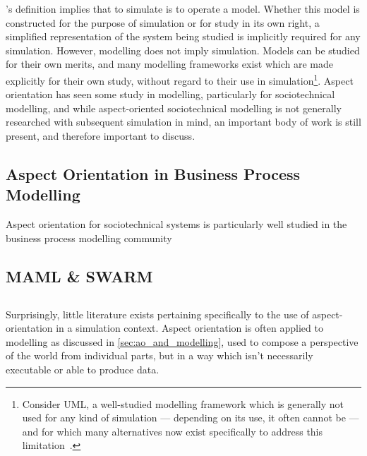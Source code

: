 \citeauthor{smintro}'s definition implies that to simulate is to operate a
model. Whether this model is constructed for the purpose of simulation or for
study in its own right, a simplified representation of the system being studied
is implicitly required for any simulation. However, modelling does not imply
simulation. Models can be studied for their own merits, and many modelling
frameworks exist which are made explicitly for their own study, without regard
to their use in simulation\footnote{Consider UML, a well-studied modelling
framework which is generally not used for any kind of simulation --- depending
on its use, it often cannot be --- and for which many alternatives now exist
specifically to address this
limitation~\cite{opm_original,ExecutableBPMNMitsyuk}.}. Aspect orientation has seen some study in modelling,
particularly for sociotechnical modelling, and while aspect-oriented
sociotechnical modelling is not generally researched with subsequent simulation
in mind, an important body of work is still present, and therefore important to
discuss.

\subsection{Aspect Orientation in Business Process Modelling}
Aspect orientation for sociotechnical systems is particularly well studied in
the business process modelling
community\cite{Machado_2011,Cappelli_AOBPM}~


\subsection{MAML \& SWARM}


\subsection{}




Surprisingly, little literature exists pertaining specifically to the use of
aspect-orientation in a simulation context. Aspect orientation is often applied
to modelling as discussed in \cref{sec:ao_and_modelling}, used to compose a perspective of the world from individual
parts, but in a way which isn't necessarily executable or able to produce data.

